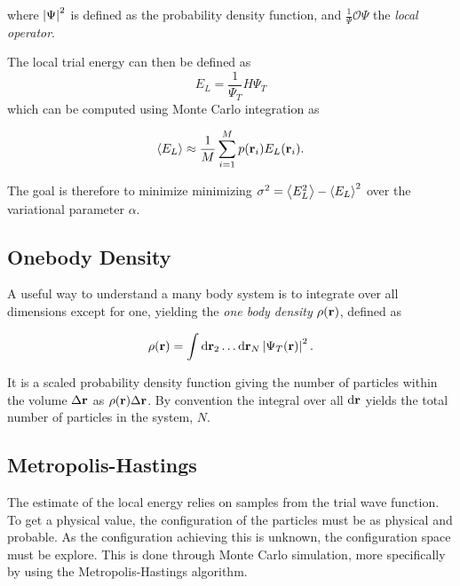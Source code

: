 where \(\abs{\Psi}^{2}\) is defined as the probability density function, and
\(\frac{1}{\Psi}\mathcal{O}\Psi\) the \textit{local operator}.

The local trial energy can then be defined as
\begin{equation*}
  E_{L} =\frac{1}{\Psi_{T}}H\Psi_{T}
\end{equation*}
which can be computed using Monte Carlo integration as

\begin{align*}
  \expval{E_{L}} \approx \frac{1}{M}\sum_{i=1}^{M} p(\vb{r}_{i})E_{L}(\vb{r}_{i}).
\end{align*}

The goal is therefore to minimize minimizing \(\sigma^{2} = \expval{E_{L}^{2}} -
\expval{E_{L}}^{2}\) over the variational parameter \(\alpha\).


\subsection{Onebody Density}

A useful way to understand a many body system is to integrate over all
dimensions except for one, yielding the \textit{one body density}
\(\rho(\vb{r})\), defined as

\begin{align*}
  \rho( \vb{r} ) = \int \dd \mathbf{r}_{2} \ldots \dd \mathbf{r}_{N} \left| \Psi_T(\vb{r}) \right|^{2}.
\end{align*}

It is a scaled probability density function giving the number of particles
within the volume \(\Delta \vb{r}\) as \(\rho(\vb{r})\Delta \vb{r}\).
By convention the integral over all \(\dd \vb{r}\) yields the total number of
particles in the system, \(N\).


\subsection{Metropolis-Hastings}

The estimate of the local energy relies on samples from the trial wave function.
To get a physical value, the configuration of the particles must be as physical
and probable. As the configuration achieving this is unknown, the configuration
space must be explore. This is done through Monte Carlo simulation, more
specifically by using the Metropolis-Hastings algorithm.

